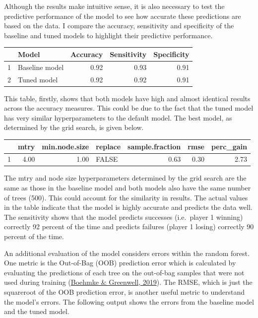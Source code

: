 \documentclass[11pt,preprint, authoryear]{elsarticle}
\let\origtable\table
\let\endorigtable\endtable
\renewenvironment{table}[1][2] {
    \expandafter\origtable\expandafter[H]
} {
    \endorigtable
}
\numberwithin{equation}{section}
\numberwithin{figure}{section}
\numberwithin{table}{section}
\begin{document}
Although the results make intuitive sense, it is also necessary to test
the predictive performance of the model to see how accurate these
predictions are based on the data. I compare the accuracy, sensitivity
and specificity of the baseline and tuned models to highlight their
predictive performance.

\begin{table}[ht]
\centering
\begin{tabular}{rlrrr}
  \hline
 & Model & Accuracy & Sensitivity & Specificity \\ 
  \hline
1 & Baseline model & 0.92 & 0.93 & 0.91 \\ 
  2 & Tuned model & 0.92 & 0.92 & 0.91 \\ 
   \hline
\end{tabular}
\caption{Accuracy Across the Baseline and Tuned Models} 
\end{table}

This table, firstly, shows that both models have high and almost
identical results across the accuracy measures. This could be due to the
fact that the tuned model has very similar hyperparameters to the
default model. The best model, as determined by the grid search, is
given below.

\begin{table}[ht]
\centering
\begin{tabular}{rrrlrrr}
  \hline
 & mtry & min.node.size & replace & sample.fraction & rmse & perc\_gain \\ 
  \hline
1 & 4.00 & 1.00 & FALSE & 0.63 & 0.30 & 2.73 \\ 
   \hline
\end{tabular}
\caption{Grid Search Results} 
\end{table}

The mtry and node size hyperparameters determined by the grid search are
the same as those in the baseline model and both models also have the
same number of trees (500). This could account for the similarity in
results. The actual values in the table indicate that the model is
highly accurate and predicts the data well. The sensitivity shows that
the model predicts successes (i.e.~player 1 winning) correctly 92
percent of the time and predicts failures (player 1 losing) correctly 90
percent of the time.

An additional evaluation of the model considers errors within the random
forest. One metric is the Out-of-Bag (OOB) prediction error which is
calculated by evaluating the predictions of each tree on the out-of-bag
samples that were not used during training
(\protect\hyperlink{ref-boehmke2019hands}{Boehmke \& Greenwell, 2019}).
The RMSE, which is just the squareroot of the OOB prediction error, is
another useful metric to understand the model's errors. The following
output shows the errors from the baseline model and the tuned model.
\end{document}
